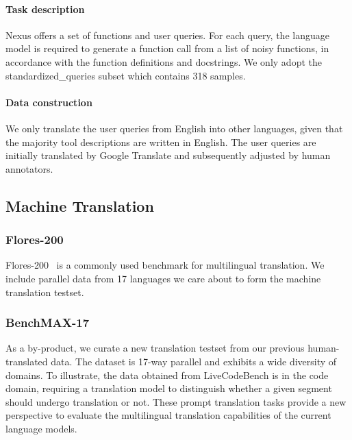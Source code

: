 \paragraph{Task description}
Nexus offers a set of functions and user queries.
For each query, the language model is required to generate a function call from a list of noisy functions, in accordance with the function definitions and docstrings.
We only adopt the standardized\_queries subset which contains 318 samples.

\paragraph{Data construction}
We only translate the user queries from English into other languages, given that the majority tool descriptions are written in English.
The user queries are initially translated by Google Translate and subsequently adjusted by human annotators.

\subsection{Machine Translation}
\subsubsection{Flores-200}
Flores-200~\cite{costa2022no} is a commonly used benchmark for multilingual translation.
We include parallel data from 17 languages we care about to form the machine translation testset.
\subsubsection{BenchMAX-17}
As a by-product, we curate a new translation testset from our previous human-translated data.
The dataset is 17-way parallel and exhibits a wide diversity of domains.
To illustrate, the data obtained from LiveCodeBench is in the code domain, requiring a translation model to distinguish whether a given segment should undergo translation or not.
These prompt translation tasks provide a new perspective to evaluate the multilingual translation capabilities of the current language models.